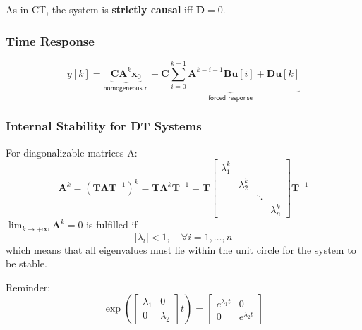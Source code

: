 \renewcommand{\arraystretch}{1}
\setlength{\tabcolsep}{\oldtabcolsep}

As in CT, the system is \textbf{strictly causal} iff $\mathbf{D}=0$.

\subsubsection{Time Response}
\noindent\begin{equation*}
    y[k]=\underbrace{\mathbf{CA}^{k}\mathbf{x}_0}_{\textsf{homogeneous r.}} + \underbrace{\mathbf{C}\sum_{i=0}^{k-1}\mathbf{A}^{k-i-1}\mathbf{Bu}[i]+\mathbf{Du}[k]}_{\textsf{forced response}}
\end{equation*}


\subsubsection{Internal Stability for DT Systems}

For diagonalizable matrices A:\
\begin{equation*}
    \mathbf{A}^{k} ={(\mathbf{T}\bm{\Lambda}\mathbf{T}^{-1})}^k=\mathbf{T}\bm{\Lambda}^{k}\mathbf{T}^{-1}=\mathbf{T}
    \begin{bmatrix}
        \lambda_1^k &             &        &             \\
                    & \lambda_2^k &        &             \\
                    &             & \ddots &             \\
                    &             &        & \lambda_n^k
    \end{bmatrix}\mathbf{T}^{-1}
\end{equation*}
$\lim_{k\to+\infty}\mathbf{A}^k=0$ is fulfilled if
\begin{equation*}
    |\lambda_i| <1,\quad\forall i=1,\ldots,n
\end{equation*}
which means that all eigenvalues must lie within the unit circle for the system to be stable.

Reminder:
\begin{equation*}
    \exp\left(
    \begin{bmatrix}
        \lambda_1 & 0         \\
        0         & \lambda_2
    \end{bmatrix}
    t\right) =
    \begin{bmatrix}
        e^{\lambda_{1}t} & 0                \\
        0                & e^{\lambda_{2}t}
    \end{bmatrix}
\end{equation*}

